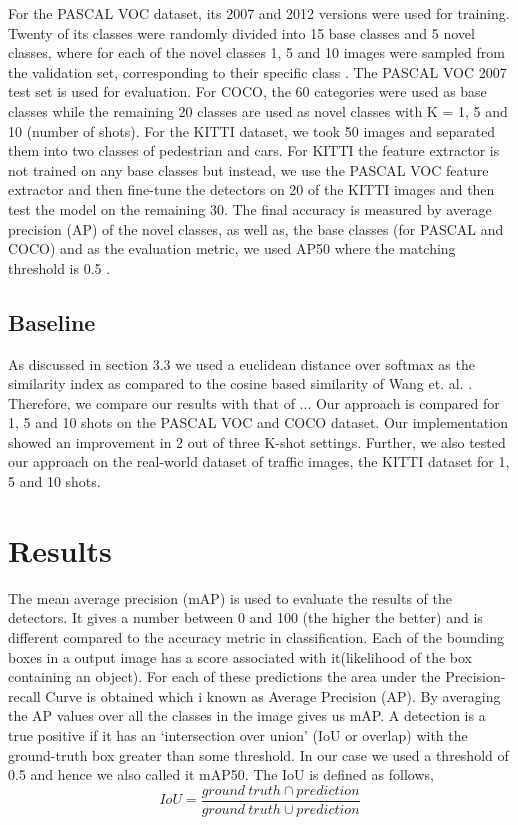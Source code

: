 \documentclass{article}
\begin{document}
For the PASCAL VOC dataset, its 2007 and 2012 versions were used for training. Twenty of its classes were randomly divided into 15 base classes and 5 novel classes, where for each of the novel classes 1,  5 and 10 images were sampled from the validation set, corresponding to their specific class \cite{wang2020frustratingly}. The PASCAL VOC 2007 test set is used for evaluation. For COCO, the 60 categories were used as base classes while the remaining 20 classes are used as novel classes with  K = 1, 5 and 10 (number of shots). For the KITTI dataset, we took 50 images and separated them into two classes of pedestrian and cars. For KITTI the feature extractor is not trained on any base classes but instead, we use the PASCAL VOC feature extractor and then fine-tune the detectors on 20 of the KITTI images and then test the model on the remaining 30. The final accuracy is measured by average precision (AP) of the novel classes, as well as, the base classes (for PASCAL and COCO)  and as the evaluation metric, we used AP50 where the matching threshold is 0.5 \cite{wang2020frustratingly}.

\subsection{Baseline}
As discussed in section 3.3 we used a euclidean distance over softmax as the similarity index as compared to the cosine based similarity of Wang et. al. \cite{wang2020frustratingly}. Therefore, we compare our results with that of \cite{wang2020frustratingly}... Our approach is compared for 1, 5 and 10 shots on the PASCAL VOC and COCO dataset. Our implementation showed an improvement in 2 out of three K-shot settings. Further, we also tested our approach on the real-world dataset of traffic images, the KITTI dataset for 1, 5 and 10 shots.  

\section{Results}

The mean average precision (mAP) is used to evaluate the results of the detectors. It gives a number between 0 and 100 (the higher the better) and is different compared to the accuracy metric in classification. Each of the bounding boxes in a output image has a score associated with it(likelihood of the box containing an object). For each of these predictions the area under the Precision-recall Curve is obtained which i known as Average Precision (AP). By averaging the AP values over all the classes in the image gives us mAP. A detection is a true positive if it has an ‘intersection over union’ (IoU or overlap) with the ground-truth box greater than some threshold. In our case we used a threshold of 0.5 and hence we also called it mAP50. The IoU is defined as follows,
\begin{equation}
    IoU = \frac{ground \  truth \cap prediction}{ground \  truth  \cup prediction}
\end{equation}
\end{document}
